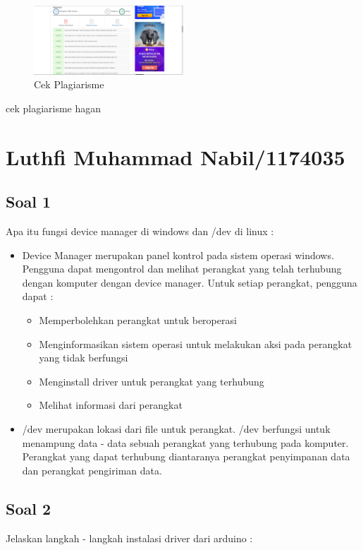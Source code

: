 	\begin{figure}
	[ht]
            \centerline{\includegraphics[width=0.5\textwidth]{figures/5/1174040/Teori/1174040_plagiat.png}}
            \caption{Cek Plagiarisme}
            \label{1174040_plagiat5}
            \end{figure}
    cek plagiarisme hagan
	

\section{Luthfi Muhammad Nabil/1174035}
\subsection{Soal 1}
Apa itu fungsi device manager di windows dan /dev di linux :
\begin{itemize}
	\item Device Manager merupakan panel kontrol pada sistem operasi windows. Pengguna dapat mengontrol dan melihat perangkat yang  telah terhubung dengan komputer dengan device manager. 
	Untuk setiap perangkat, pengguna dapat : 
		\begin{itemize}
			\item Memperbolehkan perangkat untuk beroperasi
			\item Menginformasikan sistem operasi untuk melakukan aksi pada perangkat yang tidak berfungsi
			\item Menginstall driver untuk perangkat yang terhubung
			\item Melihat informasi dari perangkat
		\end{itemize}
	\item /dev merupakan lokasi dari file untuk perangkat. /dev berfungsi untuk menampung data - data sebuah perangkat yang terhubung pada komputer. Perangkat yang dapat terhubung diantaranya perangkat penyimpanan data dan perangkat pengiriman data.
\end{itemize}

\subsection{Soal 2}
Jelaskan langkah - langkah instalasi driver dari arduino : 

